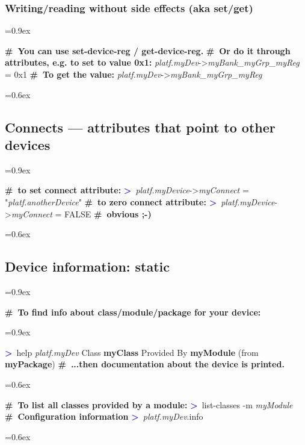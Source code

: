 \documentclass[8pt]{extarticle}
\DeclareRobustCommand{\bseries}{\fontseries{b}\selectfont}
\newenvironment{code}[1][]{%
\begin{prebox}[#1]\obeylines%
\fontdimen2\font=0.9ex%
}{%
\end{prebox}%
\fontdimen2\font=0.6ex%
}
\newcommand{\ind}{\hphantom{~~~}}
\newcommand{\sprompt}{\textcolor{blue}{\textbf{>}\ }}
\newcommand{\cmtcommon}[1]{\textcolor{Sepia}{\textbf{#1}}}
\newcommand{\cmt}[1]{\cmtcommon{\#\ #1}}
\newcommand{\p}[1]{\textit{\large#1}}
\begin{document}
\begin{multicols*}{3}
\subsubsection{Writing/reading {\bseries without} side effects (aka set/get)}

\begin{code}
    \cmt{You can use set-device-reg / get-device-reg.}
    \cmt{Or do it through attributes, e.g. to set to value 0x1:}
    \p{platf.myDev}->\p{myBank_myGrp_myReg} = 0x1
    \cmt{To get the value:}
    \p{platf.myDev}->\p{myBank_myGrp_myReg}
\end{code}

\subsection{Connects — attributes that point to other devices}

\begin{code}
    \cmt{to set connect attribute:}
    \sprompt \p{platf.myDevice}->\p{myConnect} = "\p{platf.anotherDevice}"
    \cmt{to zero connect attribute:}
    \sprompt \p{platf.myDevice}->\p{myConnect} = FALSE \ind\cmt{obvious ;-)}
\end{code}

\subsection{Device information: static}

\begin{code}
    \cmt{To find info about class/module/package for your device:}
    \begin{code}
    \sprompt help \p{platf.myDev}
    \ind Class \textbf{myClass}
    \vspace{0.3em} \ind Provided By
    \ind \ind   \textbf{myModule} (from \textbf{myPackage})
    \vspace{0.2em}
    \ind \cmt{...then documentation about the device is printed.}
    \end{code}
    \vspace{0.3em}

    \cmt{To list all classes provided by a module:}
    \sprompt list-classes -m \p{myModule}
    \cmt{Configuration information}
    \sprompt \p{platf.myDev}.info
\end{code}


\end{multicols*}
\end{document}
